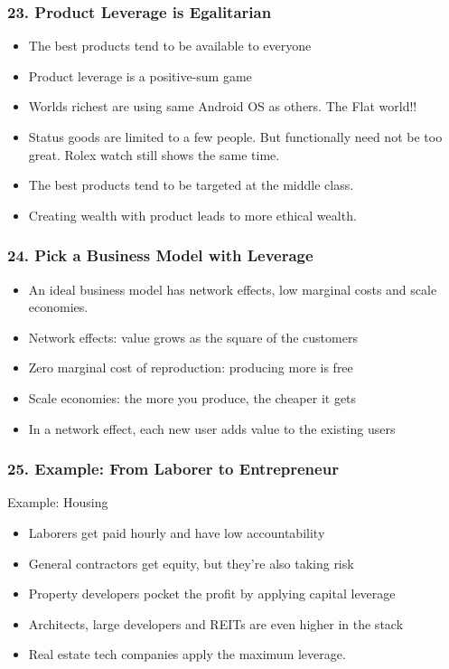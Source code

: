 \begin{frame}[fragile]
\frametitle{23. Product Leverage is Egalitarian}
\begin{itemize}
\item The best products tend to be available to everyone
\item Product leverage is a positive-sum game
\item Worlds richest are using same Android OS as others. The Flat world!!
\item Status goods are limited to a few people. But functionally need not be too great. Rolex watch still shows the same time.
\item The best products tend to be targeted at the middle class.
\item Creating wealth with product leads to more ethical wealth.
\end{itemize}
\end{frame}

\begin{frame}[fragile]
\frametitle{24. Pick a Business Model with Leverage}
\begin{itemize}
\item An ideal business model has network effects, low marginal costs and scale economies.
\item Network effects: value grows as the square of the customers
\item Zero marginal cost of reproduction: producing more is free
\item Scale economies: the more you produce, the cheaper it gets
\item In a network effect, each new user adds value to the existing users
\end{itemize}
\end{frame}

\begin{frame}[fragile]
\frametitle{25. Example: From Laborer to Entrepreneur}
Example: Housing
\begin{itemize}
\item Laborers get paid hourly and have low accountability
\item General contractors get equity, but they’re also taking risk
\item Property developers pocket the profit by applying capital leverage
\item Architects, large developers and REITs are even higher in the stack
\item Real estate tech companies apply the maximum leverage.
\end{itemize}
\end{frame}

